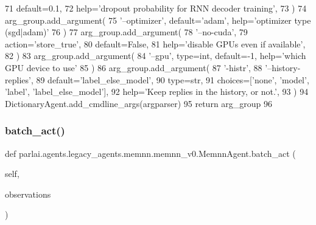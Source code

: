 \begin{DoxyCode}
71             default=0.1,
72             help=\textcolor{stringliteral}{'dropout probability for RNN decoder training'},
73         )
74         arg\_group.add\_argument(
75             \textcolor{stringliteral}{'--optimizer'}, default=\textcolor{stringliteral}{'adam'}, help=\textcolor{stringliteral}{'optimizer type (sgd|adam)'}
76         )
77         arg\_group.add\_argument(
78             \textcolor{stringliteral}{'--no-cuda'},
79             action=\textcolor{stringliteral}{'store\_true'},
80             default=\textcolor{keyword}{False},
81             help=\textcolor{stringliteral}{'disable GPUs even if available'},
82         )
83         arg\_group.add\_argument(
84             \textcolor{stringliteral}{'--gpu'}, type=int, default=-1, help=\textcolor{stringliteral}{'which GPU device to use'}
85         )
86         arg\_group.add\_argument(
87             \textcolor{stringliteral}{'-histr'},
88             \textcolor{stringliteral}{'--history-replies'},
89             default=\textcolor{stringliteral}{'label\_else\_model'},
90             type=str,
91             choices=[\textcolor{stringliteral}{'none'}, \textcolor{stringliteral}{'model'}, \textcolor{stringliteral}{'label'}, \textcolor{stringliteral}{'label\_else\_model'}],
92             help=\textcolor{stringliteral}{'Keep replies in the history, or not.'},
93         )
94         DictionaryAgent.add\_cmdline\_args(argparser)
95         \textcolor{keywordflow}{return} arg\_group
96 
\end{DoxyCode}
\mbox{\label{classparlai_1_1agents_1_1legacy__agents_1_1memnn_1_1memnn__v0_1_1MemnnAgent_ad73ed6e730b608491c2d8ef3ad25e32a}} 
\subsubsection{\texorpdfstring{batch\+\_\+act()}{batch\_act()}}
{\footnotesize\ttfamily def parlai.\+agents.\+legacy\+\_\+agents.\+memnn.\+memnn\+\_\+v0.\+Memnn\+Agent.\+batch\+\_\+act (\begin{DoxyParamCaption}\item[{}]{self,  }\item[{}]{observations }\end{DoxyParamCaption})}



